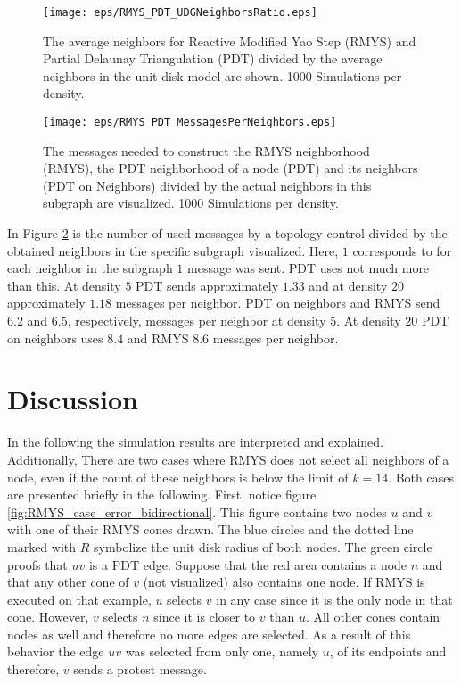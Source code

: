 \begin{figure}[h!]
\centering
\texttt{[image: eps/RMYS\_PDT\_UDGNeighborsRatio.eps]}
\caption{The average neighbors for Reactive Modified Yao Step (RMYS) and Partial Delaunay Triangulation (PDT) divided by the average neighbors in the unit disk model are shown. 1000 Simulations per density.}
\label{fig:RMYS_PDT_UDGNeighborsRatio}
\end{figure}

\begin{figure}[h!]
\centering
\texttt{[image: eps/RMYS\_PDT\_MessagesPerNeighbors.eps]}
\caption{The messages needed to construct the RMYS neighborhood (RMYS), the PDT neighborhood of a node (PDT) and its neighbors (PDT on Neighbors) divided by the actual neighbors in this subgraph are visualized. 1000 Simulations per density.}
\label{fig:RMYS_PDT_MessagesPerNeighbors}
\end{figure}

In Figure \ref{fig:RMYS_PDT_MessagesPerNeighbors} is the number of used messages by a topology control divided by the obtained neighbors in the specific subgraph visualized.
Here, $1 $ corresponds to for each neighbor in the subgraph $1 $ message was sent.
PDT uses not much more than this.
At density $5 $ PDT sends approximately $1.33$ and at density $20 $ approximately $1.18 $ messages per neighbor.
PDT on neighbors and RMYS send $6.2 $ and $6.5 $, respectively, messages per neighbor at density $5 $.
At density $20 $ PDT on neighbors uses $8.4 $ and RMYS $8.6 $ messages per neighbor.

\section{Discussion}
In the following the simulation results are interpreted and explained.
Additionally, 
There are two cases where RMYS does not select all neighbors of a node, even if the count of these neighbors is below the limit of $k=14 $.
Both cases are presented briefly in the following.
First, notice figure \ref{fig:RMYS_case_error_bidirectional}.
This figure contains two nodes $u $ and $v $ with one of their RMYS cones drawn.
The blue circles and the dotted line marked with $R $ symbolize the unit disk radius of both nodes.
The green circle proofs that $uv $ is a PDT edge.
Suppose that the red area contains a node $n $ and that any other cone of $v $ (not visualized) also contains one node.
If RMYS is executed on that example, $u $ selects $v $ in any case since it is the only node in that cone.
However, $v $ selects $n $ since it is closer to $v $ than $u $.
All other cones contain nodes as well and therefore no more edges are selected.
As a result of this behavior the edge $uv $ was selected from only one, namely $u $, of its endpoints and therefore, $v $ sends a protest message.

